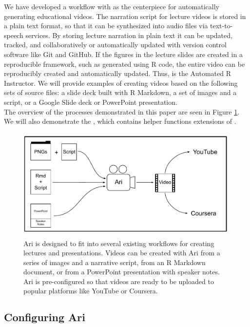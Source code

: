 We have developed a workflow with  as the centerpiece for
automatically generating educational videos. The narration script for
lecture videos is stored in a plain text format, so that it can be
synthesized into audio files via text-to-speech services. By storing
lecture narration in plain text it can be updated, tracked, and
collaboratively or automatically updated with version control software
like Git and GitHub. If the figures in the lecture slides are created in
a reproducible framework, such as generated using R code, the entire
video can be reproducibly created and automatically updated. Thus,
 is the Automated R Instructor. We will provide examples of
creating videos based on the following sets of source files: a slide
deck built with R Markdown, a set of images and a script, or a Google
Slide deck or PowerPoint presentation.\\
The overview of the processes demonstrated in this paper are seen in
Figure \ref{fig:fig1}. We will also demonstrate the ,
which contains helper functions extensions of .

\begin{Schunk}
\begin{figure}
\includegraphics[width=1\linewidth]{Figure-1-Ari-pdf} \caption[Ari is designed to fit into several existing workflows for creating lectures and presentations]{Ari is designed to fit into several existing workflows for creating lectures and presentations. Videos can be created with Ari from a series of images and a narrative script, from an R Markdown document, or from a PowerPoint presentation with speaker notes. Ari is pre-configured so that videos are ready to be uploaded to popular platforms like YouTube or Coursera.}\label{fig:fig1}
\end{figure}
\end{Schunk}

\hypertarget{configuring-ari}{%
\subsection{Configuring Ari}\label{configuring-ari}}

